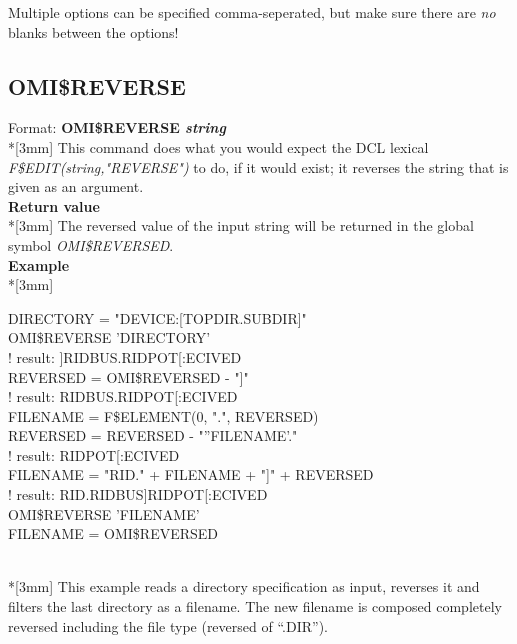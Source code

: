\documentclass[a4paper]{book}
\renewcommand{\indent}{\hspace*{5mm}}
\begin{document}
Multiple options can be specified comma-seperated, but make sure there are \textit{no}
blanks between the options!

\subsection{OMI{\$}REVERSE}
\label{subsubsec:mylabel60}

\indent Format: \textbf{OMI{\$}REVERSE \textit{string}}\\*[3mm]
This command does what you would expect the DCL lexical 
\linebreak\textit{F{\$}EDIT(string,"REVERSE")} to do, if it would exist; it reverses
the string that is given as an argument.\\[3mm]
\textbf{Return value}\\*[3mm]
The reversed value of the input string will be returned in the global symbol 
\textsl{OMI{\$}REVERSED}.\\[3mm]
\textbf{Example}\\*[3mm]
\begin{small}
\begin{texttt}
\indent{\$} DIRECTORY = "DEVICE:[TOPDIR.SUBDIR]" \\
\indent{\$} OMI{\$}REVERSE 'DIRECTORY'                    \\
\indent{\$}!\hspace{3cm} result: ]RIDBUS.RIDPOT[:ECIVED \\
\indent{\$} REVERSED = OMI{\$}REVERSED - "]"              \\
\indent{\$}!\hspace{3cm} result: RIDBUS.RIDPOT[:ECIVED \\
\indent{\$} FILENAME = F{\$}ELEMENT(0, ".", REVERSED) \\
\indent{\$} REVERSED = REVERSED - "''FILENAME'."          \\
\indent{\$}!\hspace{3cm} result: RIDPOT[:ECIVED \\
\indent{\$} FILENAME = "RID." + FILENAME + "]" + REVERSED \\
\indent{\$}!\hspace{3cm} result: RID.RIDBUS]RIDPOT[:ECIVED \\
\indent{\$} OMI{\$}REVERSE 'FILENAME' \\
\indent{\$} FILENAME = OMI{\$}REVERSED \\
\end{texttt}
\end{small}\\*[3mm]
This example reads a directory specification as input, reverses it and 
filters the last directory as a filename. The new filename is composed 
completely reversed including the file type (reversed of ``.DIR'').
\end{document}
